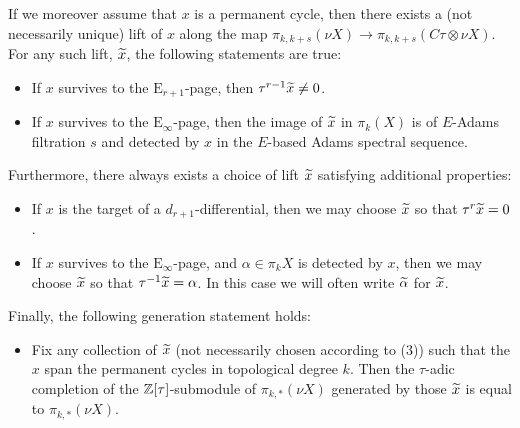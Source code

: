 \begin{thm}
  If we moreover assume that $x$ is a permanent cycle, then there exists a (not necessarily unique) lift of $x$ along the map
  $\pi_{k,k+s}(\nu X) \to \pi_{k,k+s}(C\tau \otimes \nu X)$.  For any such lift, $\wt{x}$, the following statements are true:
  \begin{itemize}
  \item[(2a)] If $x$ survives to the $\mathrm{E}_{r+1}$-page, then $\tau^{r-1} \wt{x} \neq 0$.
  \item[(2b)] If $x$ survives to the $\mathrm{E}_\infty$-page, then the image of $\wt{x}$ in $\pi_{k} (X)$ is of $E$-Adams filtration $s$ and detected by $x$ in the $E$-based Adams spectral sequence.
  \end{itemize}
  Furthermore, there always exists a choice of lift $\wt{x}$ satisfying additional properties:
  \begin{itemize}
  \item[(3a)] If $x$ is the target of a $d_{r+1}$-differential, then we may choose $\wt{x}$ so that $\tau^r \wt{x} = 0$.
  \item[(3b)] If $x$ survives to the $\mathrm{E}_\infty$-page, and $\alpha \in \pi_k X$ is detected by $x$, then we may choose $\wt{x}$ so that
    $\tau^{-1} \wt{x} = \alpha$. In this case we will often write $\wt{\alpha}$ for $\wt{x}$.
  \end{itemize}
  Finally, the following generation statement holds:
  \begin{itemize}
  \item[(4)] Fix any collection of $\wt{x}$ (not necessarily chosen according to (3)) such that the $x$ span the permanent cycles in topological degree $k$.  Then the $\tau$-adic completion of the $\mathbb{Z}[\tau]$-submodule of $\pi_{k,*}(\nu X)$ generated by those $\wt{x}$ is equal to $\pi_{k,*} (\nu X)$.
  \end{itemize}
\end{thm}

